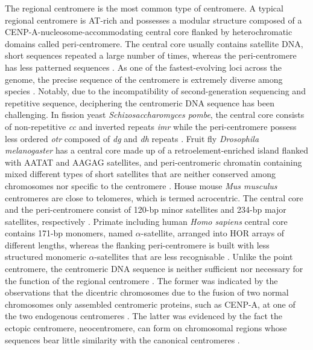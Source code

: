 The regional centromere is the most common type of centromere. A typical regional centromere is AT-rich and possesses a modular structure composed of a CENP-A-nucleosome-accommodating central core flanked by heterochromatic domains called peri-centromere. The central core usually contains satellite DNA, short sequences repeated a large number of times, whereas the peri-centromere has less patterned sequences \citep{Talbert2020WhatCentromere, McKinley2015TheFunction, Wong2020LessonsChromosomes, Muller2019TheArchitecture}. As one of the fastest-evolving loci across the genome, the precise sequence of the centromere is extremely diverse among species \citep{Melters2013ComparativeEvolution}. Notably, due to the incompatibility of second-generation sequencing and repetitive sequence, deciphering the centromeric DNA sequence has been challenging. In fission yeast \textit{Schizosaccharomyces pombe}, the central core consists of non-repetitive \textit{cc} and inverted repeats \textit{imr} while the peri-centromere possess less ordered \textit{otr} composed of \textit{dg} and \textit{dh} repeats \citep{Chikashige1989CompositeSites, Clarke1993StructureCentromeres, Murakami1991StructureRegion, Nakaseko1986ChromosomeYeast, Nakaseko1987AChromosomes., Steiner1993CentromeresLoci}. Fruit fly \textit{Drosophila melanogaster} has a central core made up of a retroelement-enriched island flanked with AATAT and AAGAG satellites, and peri-centromeric chromatin containing mixed different types of short satellites that are neither conserved among chromosomes nor specific to the centromere \citep{Talbert2018SimpleSpecies, Wong2020LessonsChromosomes, Chang2019IslandsCentromeres}. House mouse \textit{Mus musculus} centromeres are close to telomeres, which is termed acrocentric. The central core and the peri-centromere consist of 120-bp minor satellites and 234-bp major satellites, respectively \citep{Komissarov2011TandemlyGenome, Kuznetsova2006High-resolutionDNA}. Primate including human \textit{Homo sapiens} central core contains 171-bp monomers, named $\alpha$-satellite, arranged into HOR arrays of different lengths, whereas the flanking peri-centromere is built with less structured monomeric $\alpha$-satellites that are less recognisable \citep{Maio1971DNAAethiops, Rosenberg1978HighlySIMIANSIMIANSIMIANSIMIANSIMIAN, Manuelidis1978ComplexDNAs, Manuelidis1978ChromosomalDNAs, Aldrup-MacDonald2014TheGenomics, Logsdon2021The8}. Unlike the point centromere, the centromeric DNA sequence is neither sufficient nor necessary for the function of the regional centromere \citep{McKinley2015TheFunction}. The former was indicated by the observations that the dicentric chromosomes due to the fusion of two normal chromosomes only assembled centromeric proteins, such as CENP-A, at one of the two endogenous centromeres \citep{Earnshaw1985ThreeChromosome, Steiner1994AYeast, Higgins2005EngineeredPlasticity, Sato2012EpigeneticChromosomes, Sullivan1995IdentificationCentromeres, Lange2009IsodicentricPalindromes}. The latter was evidenced by the fact the ectopic centromere, neocentromere, can form on chromosomal regions whose sequences bear little similarity with the canonical centromeres \citep{Marshall2008Neocentromeres:Evolution, Voullaire1993ACentromere, Tyler-Smith1999TransmissionGenerations, Amor2004HumanProgress}. 